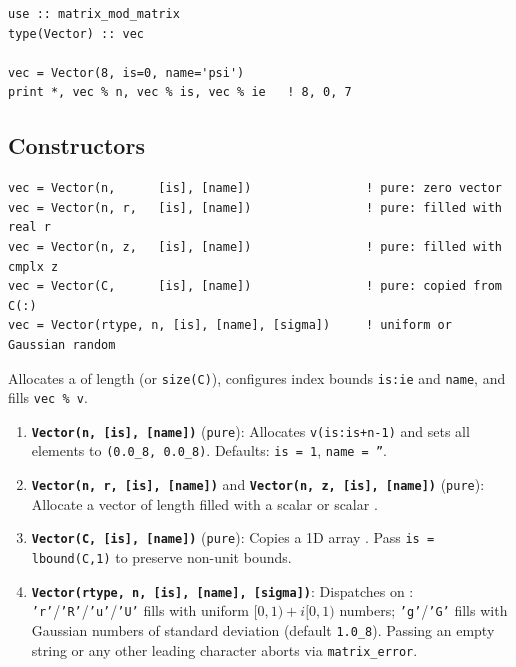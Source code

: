 \lstset{language=[95]Fortran}
\begin{lstlisting}
use :: matrix_mod_matrix
type(Vector) :: vec

vec = Vector(8, is=0, name='psi')
print *, vec % n, vec % is, vec % ie   ! 8, 0, 7
\end{lstlisting}

\subsection{Constructors}
\label{subsec:vec_constructors}


\lstset{language=[95]Fortran}
\begin{lstlisting}
vec = Vector(n,      [is], [name])                ! pure: zero vector
vec = Vector(n, r,   [is], [name])                ! pure: filled with real r
vec = Vector(n, z,   [is], [name])                ! pure: filled with cmplx z
vec = Vector(C,      [is], [name])                ! pure: copied from C(:)
vec = Vector(rtype, n, [is], [name], [sigma])     ! uniform or Gaussian random
\end{lstlisting}

Allocates a  of length  (or \texttt{size(C)}), configures index bounds \texttt{is:ie} and \texttt{name}, and fills \texttt{vec \% v}.

\begin{enumerate}
  \item \textbf{\texttt{Vector(n, [is], [name])}} (\texttt{pure}): Allocates \texttt{v(is:is+n-1)} and sets all elements to \texttt{(0.0\_8, 0.0\_8)}. Defaults: \texttt{is = 1}, \texttt{name = ''}.
  \item \textbf{\texttt{Vector(n, r, [is], [name])}} and \textbf{\texttt{Vector(n, z, [is], [name])}} (\texttt{pure}): Allocate a vector of length  filled with a  scalar  or  scalar .
  \item \textbf{\texttt{Vector(C, [is], [name])}} (\texttt{pure}): Copies a 1D  array . Pass \texttt{is = lbound(C,1)} to preserve non-unit bounds.
  \item \textbf{\texttt{Vector(rtype, n, [is], [name], [sigma])}}: Dispatches on : \texttt{'r'}/\texttt{'R'}/\texttt{'u'}/\texttt{'U'} fills with uniform $[0,1)+i[0,1)$ numbers; \texttt{'g'}/\texttt{'G'} fills with Gaussian numbers of standard deviation  (default \texttt{1.0\_8}). Passing an empty string or any other leading character aborts via \texttt{matrix\_error}.
\end{enumerate}

